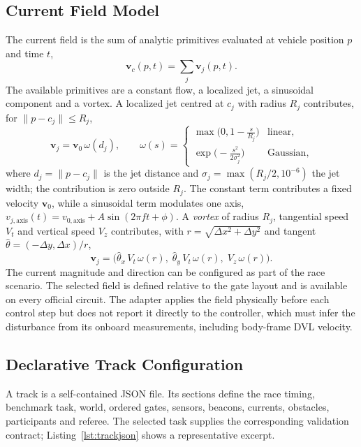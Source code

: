 \subsection{Current Field Model}

The current field is the sum of analytic primitives evaluated at vehicle
position $p$ and time $t$,
\begin{equation}
\label{eq:current_sum}
\mathbf{v}_c(p,t)=\sum_{j} \mathbf{v}_j(p,t).
\end{equation}
The available primitives are a constant flow, a localized jet, a sinusoidal
component and a vortex. A localized jet centred at $c_j$ with radius $R_j$
contributes, for $\lVert p-c_j\rVert\le R_j$,
\begin{equation}
\label{eq:jet}
\mathbf{v}_j=\mathbf{v}_0\, \omega(d_j), \qquad
\omega(s)=\begin{cases} \max\!\big(0,1-\tfrac{s}{R_j}\big) & \text{linear,}\\[2pt] \exp\!\big(-\tfrac{s^2}{2\sigma_j^2}\big) & \text{Gaussian,} \end{cases}
\end{equation}
where $d_j=\lVert p-c_j\rVert$ is the jet distance and
$\sigma_j=\max(R_j/2,10^{-6})$ the jet width; the contribution is zero outside
$R_j$. The constant term contributes a fixed velocity $\mathbf{v}_0$, while a
sinusoidal term modulates one axis,
$v_{j,\mathrm{axis}}(t)=v_{0,\mathrm{axis}}+A\sin(2\pi f t+\phi)$. A
\emph{vortex} of radius $R_j$, tangential speed $V_t$ and vertical speed $V_z$
contributes, with $r=\sqrt{\Delta x^2+\Delta y^2}$ and tangent
$\hat{\theta}=(-\Delta y,\Delta x)/r$,
\begin{equation}
\label{eq:vortex}
\mathbf{v}_j=\big(\hat{\theta}_x\,V_t\,\omega(r),\;\hat{\theta}_y\,V_t\,\omega(r),\;V_z\,\omega(r)\big).
\end{equation}
The current magnitude and direction can be configured as part of the race
scenario. The selected field is defined relative to the gate layout and is
available on every official circuit.
The adapter applies the field physically before each control step but does not
report it directly to the controller, which must infer the disturbance from its
onboard measurements, including body-frame DVL velocity.

\subsection{Declarative Track Configuration}

A track is a self-contained JSON file. Its sections define the race timing,
benchmark task, world, ordered gates, sensors, beacons, currents, obstacles,
participants and referee. The selected task supplies the corresponding
validation contract; Listing~\ref{lst:trackjson} shows a representative excerpt.

